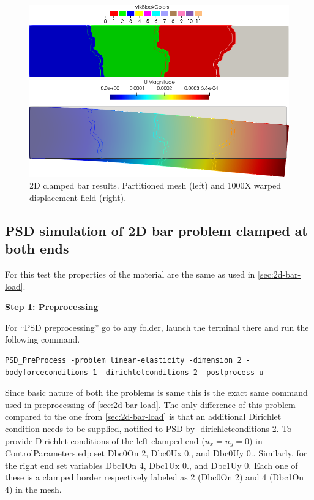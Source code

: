 {{\begin{figure}[htbp]
    \centering
    \begin{minipage}[t][2cm][t]{0.4\textwidth}
    \includegraphics[align=t,width=1\textwidth]{./Images/2d-bar-partioned.png}
    \end{minipage}\hspace{.1\textwidth}
    \begin{minipage}[t][2cm][t]{0.4\textwidth}
    \includegraphics[align=t,width=1\textwidth]{./Images/2d-bar-results.png}
    \end{minipage}
    \caption{2D clamped bar results. Partitioned mesh (left) and 1000X warped displacement field (right).}
    \label{fig:2d-bar-results}
\end{figure}


\subsection{PSD simulation of 2D bar problem clamped at both ends \label{sec:2D-bar-clamped1}}

For this test the properties of the material are the same as used in \cref{sec:2d-bar-load}. 

\textbf{Step 1: Preprocessing}

For ``PSD preprocessing'' go to any folder, launch the terminal there and run the following command.
\begin{lstlisting}[style=BashInputStyle]
PSD_PreProcess -problem linear-elasticity -dimension 2 -bodyforceconditions 1 -dirichletconditions 2 -postprocess u
\end{lstlisting}
%
Since basic nature of both the problems is same this is the exact same command used in preprocessing of \cref{sec:2d-bar-load}. The only difference of this problem compared to the one from \cref{sec:2d-bar-load} is that an additional Dirichlet condition needs to be supplied, notified to PSD by {\ttfamily -dirichletconditions 2}. To provide Dirichlet conditions of the left clamped end ($u_x=u_y=0$) in {\ttfamily ControlParameters.edp} set {\ttfamily Dbc0On 2}, {\ttfamily Dbc0Ux 0.}, and {\ttfamily Dbc0Uy 0.}. Similarly, for the right end set variables {\ttfamily Dbc1On 4}, {\ttfamily Dbc1Ux 0.}, and {\ttfamily Dbc1Uy 0}. Each one of these is a clamped border respectively labeled as 2  ({\ttfamily Dbc0On 2}) and 4 ({\ttfamily Dbc1On 4}) in the mesh.

}}
